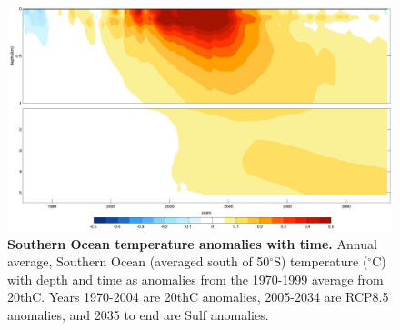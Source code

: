 \documentclass{nature}
\begin{document}
\begin{figure}%
\noindent\includegraphics[width=39pc]{figures/SuppFig3.pdf}  %
\caption{\textbf{Southern Ocean temperature anomalies with time.} Annual average, Southern Ocean (averaged south of 50$^\circ$S) temperature ($^\circ$C) with depth and time as anomalies from the 1970-1999 average from 20thC. Years 1970-2004 are 20thC anomalies, 2005-2034 are RCP8.5 anomalies, and 2035 to end are Sulf anomalies.}
\label{fig:supp3}
\end{figure}







%






\end{document}
